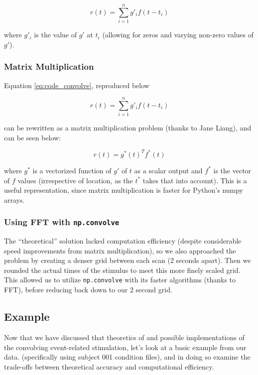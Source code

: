 \begin{equation} \label{eq:code_convolve}
r(t)= \sum_{i=1}^n g'_{i} f(t-t_i)
\end{equation}

where $g'_{i}$ is the value of $g'$ at $t_i$ (allowing for zeros and varying 
non-zero values of $g'$).


\subsubsection{Matrix Multiplication}
Equation \ref{eq:code_convolve}, reproduced below

$$r(t)= \sum_{i=1}^n g'_{i} f(t-t_i)$$

can be rewritten as a matrix multiplication problem (thanks to Jane Liang), 
and can be seen below:

\begin{equation} \label{eq:matrix_code_convolve}
r(t)=  g^*(t)^T f^*(t)
\end{equation}

where $g^*$ is a vectorized function of $g'$ of $t$ as a scalar output and 
$f^*$ is the vector of $f$ values (irrespective of location, as the $t^*$ 
takes that into account). This is a useful representation, since matrix 
multiplication is faster for Python's numpy arrays. 


\subsubsection{Using FFT with \texttt{np.convolve}}
The ``theoretical'' solution lacked computation efficiency (despite 
considerable speed improvements from matrix multiplication), so we also 
approached the problem by creating a denser grid between each scan (2 seconds 
apart). Then we rounded the actual times of the stimulus to meet this more 
finely scaled grid. This allowed us to utilize \texttt{np.convolve} with its 
faster algorithms (thanks to FFT), before reducing back down to our 2 second 
grid. 


\subsection{Example}

Now that we have discussed that theoretics of and possible implementations of the 
convolving event-related stimulation, let's look at a basic example from our data.
(specifically using subject 001 condition files), and in doing so examine the 
trade-offs between theoretical accuracy and computational efficiency.


